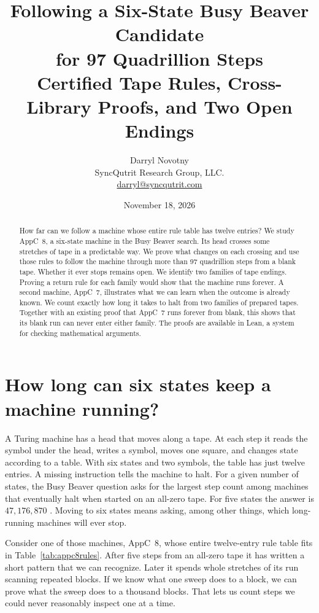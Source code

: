 \documentclass[11pt]{article}
\title{\textbf{Following a Six-State Busy Beaver Candidate\\ for 97 Quadrillion Steps}\\ \vspace{0.35em}
\large Certified Tape Rules, Cross-Library Proofs, and Two Open Endings}
\author{Darryl Novotny\\SyncQutrit Research Group, LLC.\\\href{mailto:darryl@syncqutrit.com}{darryl@syncqutrit.com}}
\date{November 18, 2026}
\DeclareRobustCommand{\_}{\ifmmode\sb\else\textunderscore\allowbreak\fi}
\theoremstyle{definition}
\theoremstyle{remark}
\begin{document}
\maketitle
\begin{abstract}
How far can we follow a machine whose entire rule table has twelve entries? We study AppC~8, a six-state machine in the Busy Beaver search. Its head crosses some stretches of tape in a predictable way. We prove what changes on each crossing and use those rules to follow the machine through more than 97 quadrillion steps from a blank tape. Whether it ever stops remains open. We identify two families of tape endings. Proving a return rule for each family would show that the machine runs forever. A second machine, AppC~7, illustrates what we can learn when the outcome is already known. We count exactly how long it takes to halt from two families of prepared tapes. Together with an existing proof that AppC~7 runs forever from blank, this shows that its blank run can never enter either family. The proofs are available in Lean, a system for checking mathematical arguments.
\end{abstract}

\section{How long can six states keep a machine running?}
\label{sec:scope}
A Turing machine has a head that moves along a tape. At each step it reads the symbol under the head, writes a symbol, moves one square, and changes state according to a table. With six states and two symbols, the table has just twelve entries. A missing instruction tells the machine to halt. For a given number of states, the Busy Beaver question asks for the largest step count among machines that eventually halt when started on an all-zero tape. For five states the answer is $47{,}176{,}870$ \cite{bbchallenge2024bb5}. Moving to six states means asking, among other things, which long-running machines will ever stop.

Consider one of those machines, AppC~8, whose entire twelve-entry rule table fits in Table~\ref{tab:appc8rules}. After five steps from an all-zero tape it has written a short pattern that we can recognize. Later it spends whole stretches of its run scanning repeated blocks. If we know what one sweep does to a block, we can prove what the sweep does to a thousand blocks. That lets us count steps we could never reasonably inspect one at a time.
\end{document}
